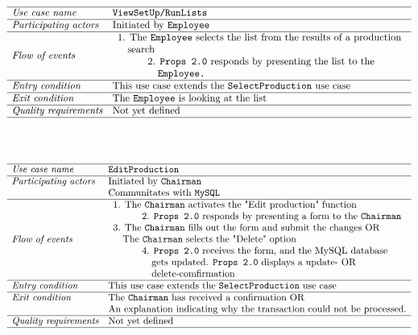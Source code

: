 \documentclass[12pt]{article}
\begin{document}
\\\\
\[
\begin{array}{ll}
\hline
\textit{Use case name} & \texttt{ViewSetUp/RunLists} \\
\hline
\textit{Participating actors} & \text{Initiated by \texttt{Employee}} \\
\hline
\textit{Flow of events} & 
\begin{array}{l}
\text{1. The \texttt{Employee} selects the list from the results of a production} \\ \quad \text{search} \\
\quad \quad \quad \text{2. \texttt{Props 2.0} responds by presenting the list to the}\\ \quad \quad \quad \quad \texttt{Employee.}
\end{array} \\
\hline
\textit{Entry condition} & \text{This use case extends the  \texttt{SelectProduction} use case} \\
\hline
\textit{Exit condition} & \text{The \texttt{Employee} is looking at the list} \\
\hline
\textit{Quality requirements} & \text{Not yet defined} \\
\hline
\end{array}
\]
\\\\
\[
\begin{array}{ll}
\hline
\textit{Use case name} & \texttt{EditProduction} \\
\hline
\textit{Participating actors} & \text{Initiated by \texttt{Chairman}} \\
& \text{Communitates with \texttt{MySQL}} \\
\hline
\textit{Flow of events} & 
\begin{array}{l}
\text{1. The \texttt{Chairman} activates the "Edit production" function} \\
\quad \quad \quad \text{2. \texttt{Props 2.0} responds by presenting a form to the \texttt{Chairman}}\\
\text{3. The \texttt{Chairman} fills out the form and submit the changes OR} \\ \quad \text{The \texttt{Chairman} selects the "Delete" option} \\
\quad \quad \quad \text{4. \texttt{Props 2.0} receives the form, and the MySQL database} \\ \quad \quad \quad \quad \text{gets updated. \texttt{Props 2.0} displays a update- OR}\\\quad \quad \quad \quad \text{delete-comfirmation} 
\end{array} \\
\hline
\textit{Entry condition} & \text{This use case extends the  \texttt{SelectProduction} use case} \\
\hline
\textit{Exit condition} & \text{The \texttt{Chairman} has received a confirmation OR} \\ & \text{An explanation indicating why the transaction could not be processed.} \\
\hline
\textit{Quality requirements} & \text{Not yet defined} \\
\hline
\end{array}
\]
\end{document}
